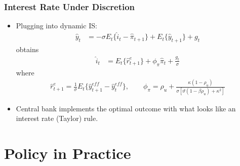 \documentclass[english,xcolor=svgnames]{beamer}
\begin{document}
\begin{frame}
\frametitle{Interest Rate Under Discretion}
\begin{itemize}
	\item Plugging into dynamic IS:
	\begin{align*}
		\hat{y}_t &=-\sigma E_t\{\hat{i}_t-\hat{\pi}_{t+1}\}+E_t\{\hat{y}_{t+1}\} + g_t
	\end{align*}
	obtains
	\begin{align*}
		\hat{i}_t &=E_t\{\hat{r}_{t+1}^e\}+\phi_\pi \hat{\pi}_{t}+\frac{g_t}{\sigma}
	\end{align*}
	where
	\begin{align*}
		 \hat{r}_{t+1}^e = \frac{1}{\sigma}E_t\{\hat{y}_{t+1}^{eff} - \hat{y}_t^{eff}\},\qquad \phi_\pi=\rho_u+\frac{\kappa(1-\rho_u)}{\sigma[\vartheta(1-\beta\rho_u)+\kappa^2]}
	\end{align*}
	\item Central bank implements the optimal outcome with what looks like an interest rate (Taylor) rule.
\end{itemize}
\end{frame}



\section{Policy in Practice}
\end{document}
